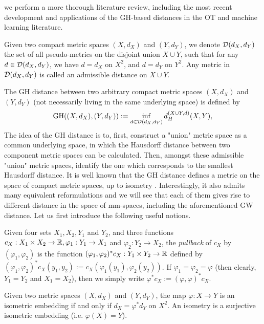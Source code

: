 we perform a more thorough literature review, including the most recent development and
applications of the GH-based distances in the OT and machine learning literature.
\begin{definition}
  Given two compact metric spaces $(X,d_X)$ and $(Y,d_Y)$, we denote $\mathcal D(d_X,d_Y)$
  the set of all pseudo-metrics on the disjoint union $X \cup Y$, such that for any
  $d \in \mathcal D(d_X,d_Y)$, we have $d = d_X$ on $X^2$, and $d = d_Y$ on $Y^2$.
  Any metric in $\mathcal D(d_X,d_Y)$ is called an admissible distance on $X \cup Y$.
\end{definition}
The GH distance between two arbitrary compact metric spaces $(X,d_X)$ and $(Y,d_Y)$
(not necessarily living in the same underlying space) is defined by
\begin{equation}
  \label{GH:zeroth}
  \text{GH}((X,d_X), (Y,d_Y)) := \inf_{d \in \mathcal D(d_X,d_Y)} d_{H}^{(X \cup Y, d)}(X, Y),
\end{equation}
The idea of the GH distance is to, first, construct a "union" metric space as a common underlying space,
in which the Hausdorff distance between two component metric spaces can be calculated. Then,
amongst these admissible "union" metric spaces, identify the one which
corresponds to the smallest Hausdorff distance.
It is well known that the GH distance defines a metric on the space of compact metric spaces,
up to isometry \citep{Gromov99,Burago01}. Interestingly, it also admits many
equivalent reformulations and we will see that each of them gives rise to different
distance in the space of mm-spaces, including the aforementioned GW distance.
Let us first introduce the following useful notions.
\begin{definition}[Pullback]
  \label{def:pullback}
  Given four sets $X_1, X_2, Y_1$ and $Y_2$,
  and three functions $c_X: X_1 \times X_2 \to \mathbb R, \varphi_1: Y_1 \to X_1$ and
  $\varphi_2: Y_2 \to X_2$, the \textit{pullback} of $c_X$ by $(\varphi_1, \varphi_2)$
  is the function $(\varphi_1, \varphi_2)^* c_X: Y_1 \times Y_2 \to \mathbb R$ defined by
  $(\varphi_1, \varphi_2)^*c_X (y_1,y_2) := c_X(\varphi_1(y_1), \varphi_2(y_2))$.
  If $\varphi_1 = \varphi_2 = \varphi$ (then clearly, $Y_1 = Y_2$ and $X_1 = X_2$),
  then we simply write $\varphi^*c_X := (\varphi, \varphi)^*c_X$.
\end{definition}
\begin{definition}
  Given two metric spaces $(X,d_X)$ and $(Y,d_Y)$,
  the map $\varphi: X \to Y$ is an isometric embedding if and only if $d_X = \varphi^* d_Y$ on $X^2$.
  An isometry is a surjective isometric embedding (i.e. $\varphi(X) = Y$).
\end{definition}
